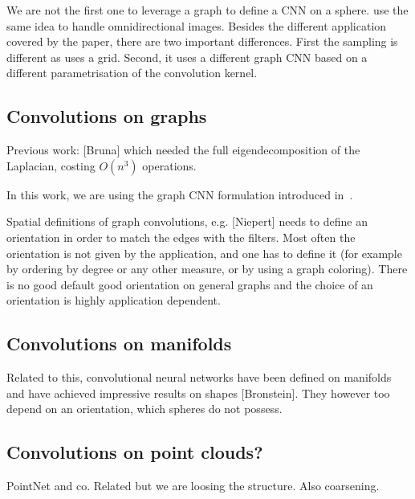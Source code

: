 \documentclass[final,twocolumn,3p,times,authoryear]{elsarticle}
\newcommand{\todo}[1]{{\color[rgb]{.6,.1,.6}{#1}}}
\newcommand{\assign}[1]{{\color[rgb]{.8,.5,.8}{Assigned: #1 }}}
\newcommand{\1}{\b{1}}              %
\newcommand{\0}{\b{0}}              %
\begin{document}
We are not the first one to leverage a graph to define a CNN on a sphere.
\cite{khasanova2017graph} use the same idea to handle omnidirectional images.
Besides the different application covered by the paper, there are two important
differences. First the sampling is different as \cite{khasanova2017graph} uses a
grid. Second, it uses a different graph CNN based on a different parametrisation
of the convolution kernel.


\subsection{Convolutions on graphs}
\assign{Michaël}

\todo{other approaches? GNNs, Kipf first order approx, message passing}

Previous work: [Bruna] which needed the full eigendecomposition of the Laplacian, costing $O(n^3)$ operations.

In this work, we are using the graph CNN formulation introduced in~\cite{defferrard2016convolutional}.

Spatial definitions of graph convolutions, e.g. [Niepert] needs to define an orientation in order to match the edges with the filters. Most often the orientation is not given by the application, and one has to define it (for example by ordering by degree or any other measure, or by using a graph coloring). There is no good default good orientation on general graphs and the choice of an orientation is highly application dependent.

\todo{Cool to have a global illustration of the network (CNN like)}

\subsection{Convolutions on manifolds}
\todo{TK and NP: maybe we just describe convolutions on sphere and graph}

Related to this, convolutional neural networks have been defined on manifolds and have achieved impressive results on shapes [Bronstein]. They however too depend on an orientation, which spheres do not possess.

\subsection{Convolutions on point clouds?}
\todo{TK and NP: maybe we just describe convolutions on sphere and graph}

PointNet and co. Related but we are loosing the structure. Also coarsening.
\end{document}
